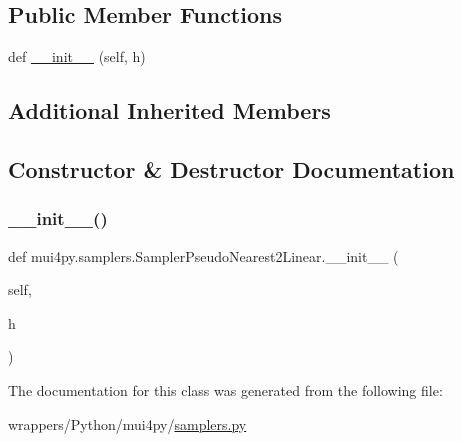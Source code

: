 \subsection*{Public Member Functions}
\begin{DoxyCompactItemize}
\item 
def \hyperlink{classmui4py_1_1samplers_1_1_sampler_pseudo_nearest2_linear_a89d2881bdd7c4ac229eede9ab7f09d33}{\+\_\+\+\_\+init\+\_\+\+\_\+} (self, h)
\end{DoxyCompactItemize}
\subsection*{Additional Inherited Members}


\subsection{Constructor \& Destructor Documentation}
\mbox{\label{classmui4py_1_1samplers_1_1_sampler_pseudo_nearest2_linear_a89d2881bdd7c4ac229eede9ab7f09d33}} 
\subsubsection{\texorpdfstring{\+\_\+\+\_\+init\+\_\+\+\_\+()}{\_\_init\_\_()}}
{\footnotesize\ttfamily def mui4py.\+samplers.\+Sampler\+Pseudo\+Nearest2\+Linear.\+\_\+\+\_\+init\+\_\+\+\_\+ (\begin{DoxyParamCaption}\item[{}]{self,  }\item[{}]{h }\end{DoxyParamCaption})}



The documentation for this class was generated from the following file\+:\begin{DoxyCompactItemize}
\item 
wrappers/\+Python/mui4py/\hyperlink{samplers_8py}{samplers.\+py}\end{DoxyCompactItemize}
